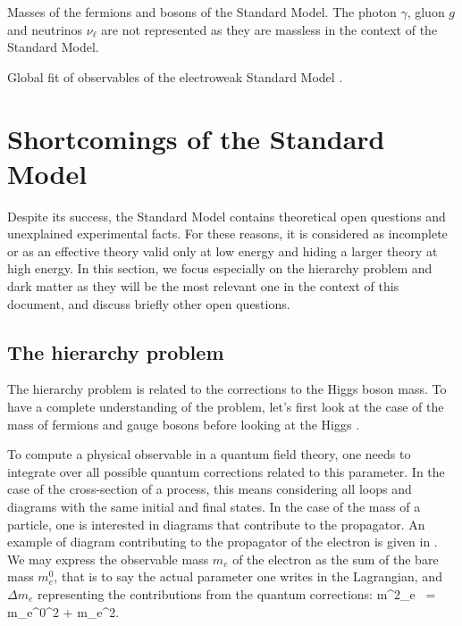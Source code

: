                  {Masses of the fermions and bosons of the Standard Model. The photon
                 $\gamma$, gluon $g$ and neutrinos $\nu_\ell$ are not represented as they
                 are massless in the context of the Standard Model.}

                 {Global fit of observables of the electroweak Standard Model \cite{GFitter}.}

    \section{Shortcomings of the Standard Model \label{sec:standardModelShortcomings}}

    Despite its success, the Standard Model contains theoretical open questions and unexplained
    experimental facts. For these reasons, it is considered as incomplete or as an effective
    theory valid only at low energy and hiding a larger theory at high energy.
    In this section, we focus especially on the hierarchy problem and dark matter as they
    will be the most relevant one in the context of this document, and discuss briefly
    other open questions.

        \subsection{The hierarchy problem}

    The hierarchy problem is related to the corrections to the Higgs boson mass.
    To have a complete understanding of the problem, let's first look at the case of the
    mass of fermions and gauge bosons before looking at the Higgs \cite{SupersymmetryDemystified}.

    To compute a physical observable in a quantum field theory, one needs to
    integrate over all possible quantum corrections related to this parameter. In the case
    of the cross-section of a process, this means considering all loops and diagrams
    with the same initial and final states. In the case of the mass of a particle, one is
    interested in diagrams that contribute to the propagator. An example of diagram contributing
    to the propagator of the electron is given in . We may
    express the observable mass $m_e$ of the electron as the sum of the bare mass $m^0_{e}$,
    that is to say the actual parameter one writes in the Lagrangian, and $\Delta m_e$ representing
    the contributions from the quantum corrections:
    {
        m^2_e \, = \, {m_e^0}^2 + \Delta m_e^2.
    }

